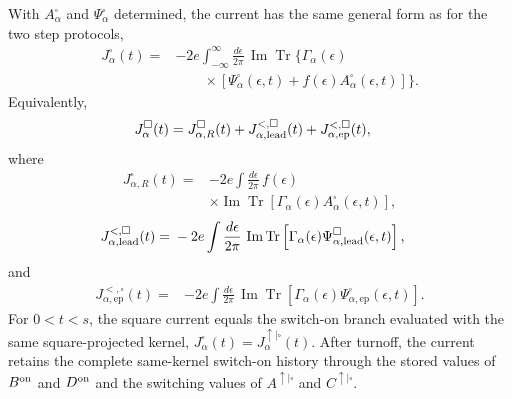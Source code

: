 \documentclass[
 reprint,
 superscriptaddress,
 amsmath,amssymb,
 aps,prb,
 longbibliography,
 floatfix
]{revtex4-2}
\newcommand{\ep}{\mathrm{ep}}
\begin{document}
With $A_\alpha^\square$ and $\Psi_\alpha^\square$ determined, the current has the same general form as for the two step protocols,
\begin{equation}
\boxed{
\begin{aligned}
J_\alpha^\square(t)
={}&
-2e
\int_{-\infty}^{\infty}
\frac{d\epsilon}{2\pi}\,
\operatorname{Im}
\operatorname{Tr}
\Bigg\{
\Gamma_\alpha(\epsilon)
\\
&\qquad\times
\left[
\Psi_\alpha^\square(\epsilon,t)
+
f(\epsilon)
A_\alpha^\square(\epsilon,t)
\right]
\Bigg\}.
\end{aligned}}
\label{eq:Jalpha-square-final}
\end{equation}
Equivalently,
\begin{equation*}
\begin{aligned}
J_\alpha^\square(t)
={}&
J_{\alpha,R}^\square(t)
+
J_{\alpha,\rm lead}^{<,\square}(t)
+
J_{\alpha,\ep}^{<,\square}(t),
\end{aligned}
\end{equation*}
where
\begin{equation*}
\begin{aligned}
J_{\alpha,R}^\square(t)
={}&
-2e
\int\frac{d\epsilon}{2\pi}\,
f(\epsilon)
\\
&\times
\operatorname{Im}
\operatorname{Tr}
\left[
\Gamma_\alpha(\epsilon)
A_\alpha^\square(\epsilon,t)
\right],
\end{aligned}
\end{equation*}
\begin{equation*}
\begin{aligned}
J_{\alpha,\rm lead}^{<,\square}(t)
={}&
-2e
\int\frac{d\epsilon}{2\pi}\,
\operatorname{Im}
\operatorname{Tr}
\left[
\Gamma_\alpha(\epsilon)
\Psi_{\alpha,\rm lead}^\square
(\epsilon,t)
\right],
\end{aligned}
\end{equation*}
and
\begin{equation*}
\begin{aligned}
J_{\alpha,\ep}^{<,\square}(t)
={}&
-2e
\int\frac{d\epsilon}{2\pi}\,
\operatorname{Im}
\operatorname{Tr}
\left[
\Gamma_\alpha(\epsilon)
\Psi_{\alpha,\ep}^\square
(\epsilon,t)
\right].
\end{aligned}
\end{equation*}
For \(0<t<s\), the square current equals the switch-on branch evaluated with the same square-projected kernel, \(J_\alpha^\square(t)=J_\alpha^{\uparrow|\square}(t)\). After turnoff, the current retains the complete same-kernel switch-on history through the stored values of $B^{\rm on}$ and $D^{\rm on}$ and the switching values of $A^{\uparrow|\square}$ and $C^{\uparrow|\square}$.
\end{document}
